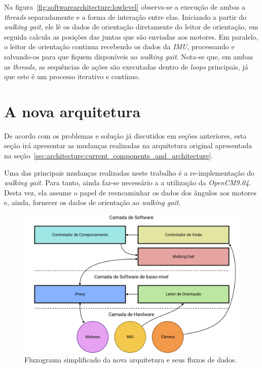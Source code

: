 Na figura~\ref{fig:softwarearchitecture:lowlevel} observa-se a execução de ambas a \textit{threads} separadamente e a forma de interação entre elas. Iniciando a partir do \textit{walking gait}, ele lê os dados de orientação diretamente do leitor de orientação, em seguida calcula as posições das juntas que são enviadas aos motores. Em paralelo, o leitor de orientação continua recebendo os dados da \textit{IMU}, processando e salvando-os para que fiquem disponíveis ao \textit{walking gait}. Nota-se que, em ambas as \textit{threads}, as sequências de ações são executadas dentro de \textit{loops} principais, já que este é um processo iterativo e contínuo.

\section{A nova arquitetura}

De acordo com os problemas e solução já discutidos em seções anteriores, esta seção irá apresentar as mudanças realizadas na arquitetura original apresentada na seção~\ref{sec:architecture:current_components_and_architecture}.

Uma das principais mudanças realizadas neste trabalho é a re-implementação do \textit{walking gait}. Para tanto, ainda faz-se necessário a a utilização da \textit{OpenCM9.04}. Desta vez, ela assume o papel de reencaminhar os dados dos ângulos aos motores e, ainda, fornecer os dados de orientação ao \textit{walking gait}.

\begin{figure}[h!]
	\centering
	\includegraphics[scale=1]{imagens/svg/softwarearchitecture-newproposal}
	\caption{Fluxograma simplificado da nova arquitetura e seus fluxos de dados.}
	\label{fig:softwarearchitecture:newproposal}
\end{figure}

